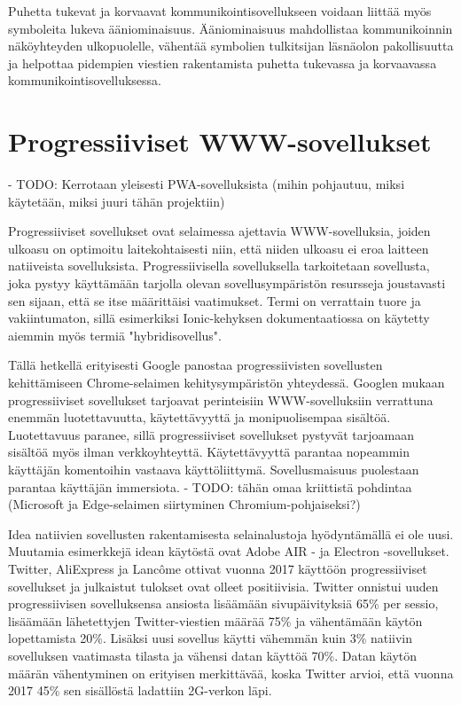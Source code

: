\documentclass[utf8]{gradu3}
\begin{document}
Puhetta tukevat ja korvaavat kommunikointisovellukseen voidaan liittää myös symboleita lukeva ääniominaisuus. Ääniominaisuus mahdollistaa kommunikoinnin näköyhteyden ulkopuolelle, vähentää symbolien tulkitsijan läsnäolon pakollisuutta ja helpottaa pidempien viestien rakentamista puhetta tukevassa ja korvaavassa kommunikointisovelluksessa.\parencite[]{AAC-interventions}

\section{Progressiiviset WWW-sovellukset}

- TODO: Kerrotaan yleisesti PWA-sovelluksista (mihin pohjautuu, miksi käytetään, miksi juuri tähän projektiin)

Progressiiviset sovellukset ovat selaimessa ajettavia WWW-sovelluksia, joiden ulkoasu on optimoitu laitekohtaisesti niin, että niiden ulkoasu ei eroa laitteen natiiveista sovelluksista. Progressiivisella sovelluksella tarkoitetaan sovellusta, joka pystyy käyttämään tarjolla olevan sovellusympäristön resursseja joustavasti sen sijaan, että se itse määrittäisi vaatimukset. Termi on verrattain tuore ja vakiintumaton, sillä esimerkiksi Ionic-kehyksen dokumentaatiossa on käytetty aiemmin myös termiä "hybridisovellus".

Tällä hetkellä erityisesti Google panostaa progressiivisten sovellusten kehittämiseen Chrome-selaimen kehitysympäristön yhteydessä. Googlen mukaan progressiiviset sovellukset tarjoavat perinteisiin WWW-sovelluksiin verrattuna enemmän luotettavuutta, käytettävyyttä ja monipuolisempaa sisältöä. Luotettavuus paranee, sillä progressiiviset sovellukset pystyvät tarjoamaan sisältöä myös ilman verkkoyhteyttä. Käytettävyyttä parantaa nopeammin käyttäjän komentoihin vastaava käyttöliittymä. Sovellusmaisuus puolestaan parantaa käyttäjän immersiota. \parencite[]{google-pwa-marketing}
- TODO: tähän omaa kriittistä pohdintaa (Microsoft ja Edge-selaimen siirtyminen Chromium-pohjaiseksi?)

Idea natiivien sovellusten rakentamisesta selainalustoja hyödyntämällä ei ole uusi. Muutamia esimerkkejä idean käytöstä ovat Adobe AIR - ja Electron -sovellukset. Twitter, AliExpress ja Lancôme ottivat vuonna 2017 käyttöön progressiiviset sovellukset ja julkaistut tulokset ovat olleet positiivisia. Twitter onnistui uuden progressiivisen sovelluksensa ansiosta lisäämään sivupäivityksiä 65\% per sessio, lisäämään lähetettyjen Twitter-viestien määrää 75\% ja vähentämään käytön lopettamista 20\%. Lisäksi uusi sovellus käytti vähemmän kuin 3\% natiivin sovelluksen vaatimasta tilasta ja vähensi datan käyttöä 70\%. Datan käytön määrän vähentyminen on erityisen merkittävää, koska Twitter arvioi, että vuonna 2017 45\% sen sisällöstä ladattiin 2G-verkon läpi. \parencite[]{beginners-guide-pwa}
\end{document}
